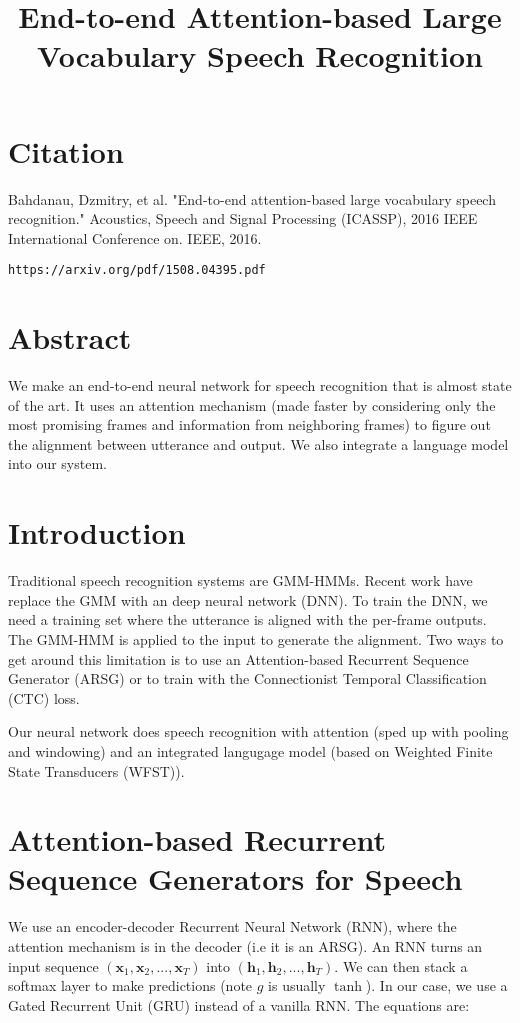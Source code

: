 \documentclass[a4paper]{article}
\title{End-to-end Attention-based Large Vocabulary Speech Recognition}
\date{}
\begin{document}
\maketitle

\section{Citation}
Bahdanau, Dzmitry, et al. "End-to-end attention-based large vocabulary speech recognition." Acoustics, Speech and Signal Processing (ICASSP), 2016 IEEE International Conference on. IEEE, 2016.

\begin{verbatim}
https://arxiv.org/pdf/1508.04395.pdf
\end{verbatim}

\section{Abstract}
We make an end-to-end neural network for speech recognition that is almost
state of the art. It uses an attention mechanism (made faster by considering
only the most promising frames and information from neighboring frames)
to figure out the alignment between utterance and output. We also integrate
a language model into our system.

\section{Introduction}
Traditional speech recognition systems are GMM-HMMs. Recent work have
replace the GMM with an deep neural network (DNN). To train the DNN, we need
a training set where the utterance is aligned with the per-frame outputs.
The GMM-HMM is applied to the input to generate the alignment. Two ways to get
around this limitation is to use an Attention-based Recurrent Sequence
Generator (ARSG) or to train with the Connectionist Temporal Classification
(CTC) loss.

Our neural network does speech recognition with attention (sped up with
pooling and windowing) and an integrated langugage model (based on
Weighted Finite State Transducers (WFST)).

\section{Attention-based Recurrent Sequence Generators for Speech}
We use an encoder-decoder Recurrent Neural Network (RNN), where the
attention mechanism is in the decoder (i.e it is an ARSG).
An RNN turns an input sequence
$(\mathbf{x}_1, \mathbf{x}_2, ..., \mathbf{x}_T)$ into
$(\mathbf{h}_1, \mathbf{h}_2, ..., \mathbf{h}_T)$. We can then stack a softmax
layer to make predictions (note $g$ is usually $\tanh$). In our case, we use
a Gated Recurrent Unit (GRU) instead of a vanilla RNN. The equations are:
\end{document}
